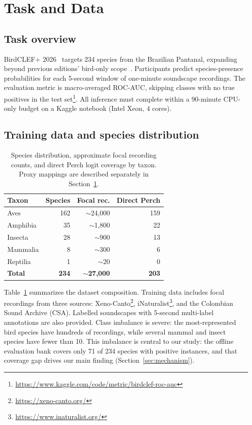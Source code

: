 \documentclass{ceurart}
\begin{document}
\section{Task and Data}
\label{sec:data}

\subsection{Task overview}

BirdCLEF+ 2026~\cite{birdclef2026} targets 234 species from the Brazilian Pantanal, expanding beyond previous editions' bird-only scope~\cite{kahl2024birdclef, kahl2025birdclef}.
Participants predict species-presence probabilities for each 5-second window of one-minute soundscape recordings.
The evaluation metric is macro-averaged ROC-AUC, skipping classes with no true positives in the test set\footnote{\url{https://www.kaggle.com/code/metric/birdclef-roc-auc}}.
All inference must complete within a 90-minute CPU-only budget on a Kaggle notebook (Intel Xeon, 4 cores).

\subsection{Training data and species distribution}

\begin{table}[t]
\caption{Species distribution, approximate focal recording counts, and direct Perch logit coverage by taxon. Proxy mappings are described separately in Section~\ref{sec:data}.}
\label{tab:taxa}
\begin{tabular}{lrrr}
\toprule
Taxon & Species & Focal rec. & Direct Perch \\
\midrule
Aves       & 162 & $\sim$24,000 & 159 \\
Amphibia   & 35  & $\sim$1,800  & 22 \\
Insecta    & 28  & $\sim$900    & 13 \\
Mammalia   & 8   & $\sim$300    & 6 \\
Reptilia   & 1   & $\sim$20     & 0 \\
\midrule
\textbf{Total} & \textbf{234} & $\sim$\textbf{27,000} & \textbf{203} \\
\bottomrule
\end{tabular}
\end{table}

Table~\ref{tab:taxa} summarizes the dataset composition.
Training data includes focal recordings from three sources: Xeno-Canto\footnote{\url{https://xeno-canto.org/}}, iNaturalist\footnote{\url{https://www.inaturalist.org/}}, and the Colombian Sound Archive (CSA).
Labelled soundscapes with 5-second multi-label annotations are also provided.
Class imbalance is severe: the most-represented bird species have hundreds of recordings, while several mammal and insect species have fewer than 10.
This imbalance is central to our study: the offline evaluation bank covers only 71 of 234 species with positive instances, and that coverage gap drives our main finding (Section~\ref{sec:mechanism}).
\end{document}
